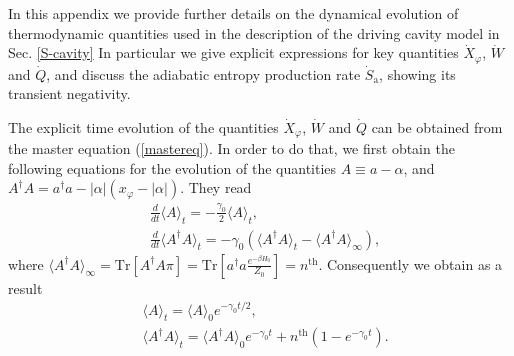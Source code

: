 \documentclass[aps,prx,twocolumn,showpacs,floatfix,superscriptaddress,graphics,longbibliography]{revtex4-1}
\newcommand{\tr}{\mathrm{Tr}}
\begin{document}
In this appendix we provide further details on the dynamical evolution of thermodynamic quantities used in the description of the driving cavity model in Sec. \ref{S-cavity}
In particular we give explicit expressions for key quantities $\dot{X}_{\varphi}$, $\dot{W}$ and $\dot{Q}$, and discuss the adiabatic entropy production rate $\dot{S}_\mathrm{a}$, 
showing its transient negativity.

The explicit time evolution of the quantities $\dot{X}_{\varphi}$, $\dot{W}$ and $\dot{Q}$ can be obtained from the master equation (\ref{mastereq}). In order to do that, we first 
obtain the following equations for the evolution of the quantities $A \equiv a - \alpha$, and $A^\dagger A = a^\dagger a - |\alpha| (x_{\varphi} - |\alpha|)$. They read
\begin{align}
& \frac{d}{dt} \langle A \rangle_t = - \frac{\gamma_0}{2} \langle A \rangle_t,  \\
& \frac{d}{dt} \langle A^\dagger A \rangle_t = - \gamma_0 \left(\langle A^\dagger A \rangle_t - \langle A^\dagger A \rangle_\infty \right), 
\end{align}
where $\langle A^\dagger A \rangle_\infty = \tr[A^\dagger A \pi] = \tr[a^\dagger a \frac{e^{-\beta H_0}}{Z_0}] = n^{\mathrm{th}}$. 
Consequently we obtain as a result 
\begin{align}\label{solsmot1}
& \langle A \rangle_t = \langle A \rangle_{0} e^{-\gamma_0 t /2}, \\ \label{solsmot2}
& \langle A^\dagger A \rangle_t = \langle A^\dagger A \rangle_{0} e^{-\gamma_0 t} + n^{\mathrm{th}} (1 - e^{-\gamma_0 t}).
\end{align} 
\end{document}
